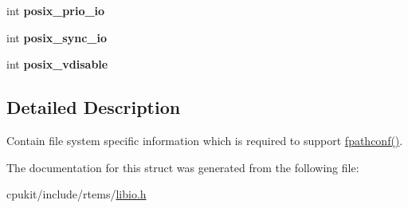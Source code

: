 \begin{DoxyCompactItemize}
\mbox{\label{structrtems__filesystem__limits__and__options__t_ac75ee254a3722042bbd7b5bec198132c}} 
int {\bfseries posix\+\_\+prio\+\_\+io}
\item 
\mbox{\label{structrtems__filesystem__limits__and__options__t_aa53c094288cb16aca9b3e500cfe1dc8f}} 
int {\bfseries posix\+\_\+sync\+\_\+io}
\item 
\mbox{\label{structrtems__filesystem__limits__and__options__t_a4b1ca4e19f6e50f8fd570b102169f037}} 
int {\bfseries posix\+\_\+vdisable}
\end{DoxyCompactItemize}


\subsection{Detailed Description}
Contain file system specific information which is required to support \mbox{\hyperlink{fpathconf_8c_a71e43208c97faad6658a5f7d7daa92cd}{fpathconf()}}. 

The documentation for this struct was generated from the following file\+:\begin{DoxyCompactItemize}
\item 
cpukit/include/rtems/\mbox{\hyperlink{libio_8h}{libio.\+h}}\end{DoxyCompactItemize}
